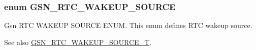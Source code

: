 \hypertarget{a00651_gae287d9e78906e2c47d820fbde51a862e}{
\subsubsection[{GSN\_\-RTC\_\-WAKEUP\_\-SOURCE}]{\setlength{\rightskip}{0pt plus 5cm}enum {\bf GSN\_\-RTC\_\-WAKEUP\_\-SOURCE}}}
\label{a00651_gae287d9e78906e2c47d820fbde51a862e}


Gsn RTC WAKEUP SOURCE ENUM. This enum defines RTC wakeup source. 

\begin{DoxySeeAlso}{See also}
\hyperlink{a00651_gaf7c5ef16a16838e7cbfc58bda46355bc}{GSN\_\-RTC\_\-WAKEUP\_\-SOURCE\_\-T}. 
\end{DoxySeeAlso}

